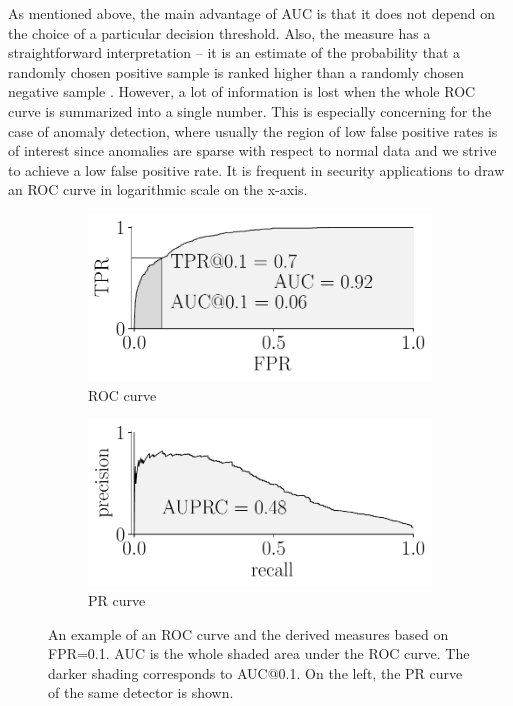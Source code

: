 As mentioned above, the main advantage of AUC is that it does not depend on the choice of a particular decision threshold. Also, the measure has a straightforward interpretation -- it is an estimate of the probability that a randomly chosen positive sample is ranked higher than a randomly chosen negative sample \cite{hand2001simple}. However, a lot of information is lost when the whole ROC curve is summarized into a single number. This is especially concerning for the case of anomaly detection, where usually the region of low false positive rates is of interest since anomalies are sparse with respect to normal data and we strive to achieve a low false positive rate. It is frequent in security applications to draw an ROC curve in logarithmic scale on the x-axis.

\begin{figure}
\centering
\begin{subfigure}[b]{0.45\textwidth} 
	\centering
	\includegraphics[width=\textwidth]{data/chapter_intro/roc_example.pdf}
	\caption{ROC curve}
	\label{fig:roc_example}
\end{subfigure}
\hfill
\begin{subfigure}[b]{0.45\textwidth}
	\centering
	\includegraphics[width=\textwidth]{data/chapter_intro/prc_example.pdf}
	\caption{PR curve}
	 \label{fig:prc_example}
\end{subfigure}
\caption{An example of an ROC curve and the derived measures based on FPR=0.1. AUC is the whole shaded area under the ROC curve. The darker shading corresponds to AUC@0.1. On the left, the PR curve of the same detector is shown.}
\label{fig:ROC}
\end{figure}

